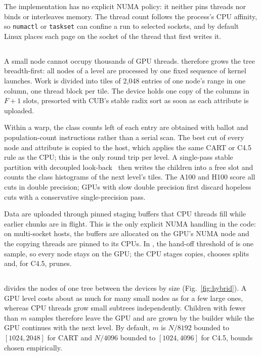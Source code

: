 The implementation has no explicit NUMA policy: it neither pins threads nor binds or interleaves memory. The thread count follows the process's CPU affinity, so \texttt{numactl} or \texttt{taskset} can confine a run to selected sockets, and by default Linux places each page on the socket of the thread that first writes it.

\subsection{\ImplGpu}
\label{sec:impl-gpu}

A small node cannot occupy thousands of GPU threads. \ImplGpu{} therefore grows the tree breadth-first: all nodes of a level are processed by one fixed sequence of kernel launches. Work is divided into tiles of 2,048 entries of one node's range in one column, one thread block per tile. The device holds one copy of the columns in $F+1$ slots, presorted with CUB's stable radix sort as soon as each attribute is uploaded.

Within a warp, the class counts left of each entry are obtained with ballot and population-count instructions rather than a serial scan. The best cut of every node and attribute is copied to the host, which applies the same CART or C4.5 rule as the CPU; this is the only round trip per level. A single-pass stable partition with decoupled look-back~\cite{merrill2016scan} then writes the children into a free slot and counts the class histograms of the next level's tiles. The A100 and H100 score all cuts in double precision; GPUs with slow double precision first discard hopeless cuts with a conservative single-precision pass.

Data are uploaded through pinned staging buffers that CPU threads fill while earlier chunks are in flight. This is the only explicit NUMA handling in the code: on multi-socket hosts, the buffers are allocated on the GPU's NUMA node and the copying threads are pinned to its CPUs. In \ImplGpu{}, the hand-off threshold of \ImplHybrid{} is one sample, so every node stays on the GPU; the CPU stages copies, chooses splits and, for C4.5, prunes.

\subsection{\ImplHybrid}
\label{sec:impl-hybrid}

\ImplHybrid{} divides the nodes of one tree between the devices by size (Fig.~\ref{fig:hybrid}). A GPU level costs about as much for many small nodes as for a few large ones, whereas CPU threads grow small subtrees independently. Children with fewer than $m$ samples therefore leave the GPU and are grown by the \ImplParallel{} builder while the GPU continues with the next level. By default, $m$ is $N/8192$ bounded to $[1024, 2048]$ for CART and $N/4096$ bounded to $[1024, 4096]$ for C4.5, bounds chosen empirically.

